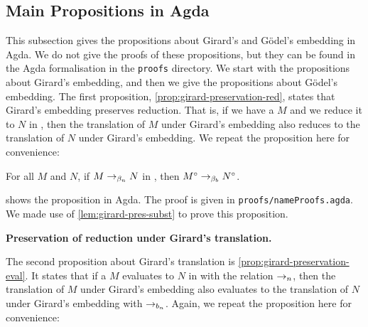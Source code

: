 %   

%   

%   

\subsection{Main Propositions in Agda}
\label{sec:proofs-main-propositions}
This subsection gives the propositions about Girard's and Gödel's embedding in Agda.
We do not give the proofs of these propositions, but they can be found in the Agda formalisation in the \texttt{proofs} directory.
We start with the propositions about Girard's embedding, and then we give the propositions about Gödel's embedding.
The first proposition, \cref{prop:girard-preservation-red}, states that Girard's embedding preserves reduction.
That is, if we have a \lterm $M$ and we reduce it to $N$ in \lan, then the translation of $M$ under Girard's embedding also reduces to the translation of $N$ under Girard's embedding. 
We repeat the proposition here for convenience:
\begin{center}
 For all \lterm $M$ and $N$, if $M \to_{\beta_n} N$ in \lan, then ${M}^\circ \to_{\beta_b} {N}^\circ$.
\end{center}
 shows the proposition in Agda.
The proof is given in \texttt{proofs/nameProofs.agda}.
We made use of \cref{lem:girard-pres-subst} to prove this proposition.

\begin{proposition}
  \label{proof:girard-preservation-red}
  \textbf{Preservation of reduction under Girard's translation.} 
  \small
  
\end{proposition}

The second proposition about Girard's translation is \cref{prop:girard-preservation-eval}.
It states that if a \lterm $M$ evaluates to $N$ in \lan with the relation $\to_n$, 
then the translation of $M$ under Girard's embedding also evaluates to the translation of $N$ under Girard's embedding with $\to_{b_n}$.
Again, we repeat the proposition here for convenience:

